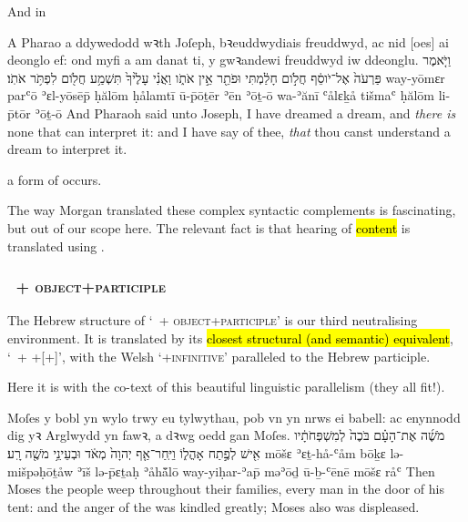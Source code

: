 \begin{paper}
	And in
\end{paper}
\begin{example}{1}{41}{15}{1}{}
	\quoling
	{A Pharao a ddywedodd wꝛth Joſeph, bꝛeuddwydiais freuddwyd, ac nid [oes] ai deonglo ef: ond myfi a   am danat ti, y gwꝛandewi freuddwyd iw ddeonglu.}
	{וַיֹּ֤אמֶר פַּרְעֹה֙ אֶל־יֹוסֵ֔ף חֲלֹ֣ום חָלַ֔מְתִּי וּפֹתֵ֖ר אֵ֣ין אֹתֹ֑ו וַאֲנִ֗י  עָלֶ֙יךָ֙  תִּשְׁמַ֥ע חֲלֹ֖ום לִפְתֹּ֥ר אֹתֹֽו׃}
	{way-yōmɛr parʿō ʾɛl-yōsēp̄ ḥălōm ḥålamtī ū-p̄ōṯēr ʾēn ʾōṯ-ō wa-ʾănī  ʿålɛḵå  tišmaʿ ḥălōm li-p̄tōr ʾōṯ-ō}
	{And Pharaoh said unto Joseph, I have dreamed a dream, and \textit{there is} none that can interpret it: and I have  say of thee, \textit{that} thou canst understand a dream to interpret it.}
\end{example}
\begin{paper}
	\explain a form of  occurs.
\end{paper}

\begin{paper}
	The way Morgan translated these complex syntactic complements is fascinating, but out of our scope here. The relevant fact is that hearing of \hl{content} is translated using .
\end{paper}



\subsubsection{\shama~+ \textsc{object}+\textsc{participle}}

\begin{paper}
	{\click} The Hebrew structure of ‘\shama~+ \textsc{object}+\textsc{participle}’ is our third neutralising environment. {\click} It is translated by its \hl{closest structural (and semantic) equivalent}, ‘~+ +[+]’, with the Welsh ‘+\textsc{infinitive}’ paralleled to the Hebrew participle.
\end{paper}

\begin{paper}
	Here it is with the co-text of this beautiful linguistic parallelism (they all fit!).
\end{paper}
\begin{example}{4}{11}{10}{}{}
	\quoling
	{ Moſes y bobl yn wylo trwy eu tylwythau, pob vn yn nrws ei babell: ac enynnodd dig yꝛ Arglwydd yn fawꝛ, a dꝛwg oedd gan Moſes.}
	{ מֹשֶׁ֜ה אֶת־הָעָ֗ם בֹּכֶה֙ לְמִשְׁפְּחֹתָ֔יו אִ֖ישׁ לְפֶ֣תַח אָהֳל֑וֹ וַיִּֽחַר־אַ֤ף יְהוָה֙ מְאֹ֔ד וּבְעֵינֵ֥י מֹשֶׁ֖ה רָֽע׃}
	{ mōšɛ ʾɛṯ-hå-ʿåm bōḵɛ lə-mišpəḥōṯåw ʾīš lə-p̄ɛṯaḥ ʾåhå̄̆lō way-yiḥar-ʾap̄ {\YHWH} məʾōḏ ū-ḇ-ʿēnē mōšɛ råʿ}
	{Then Moses  the people weep throughout their families, every man in the door of his tent: and the anger of the {\LORD} was kindled greatly; Moses also was displeased.}
\end{example}




